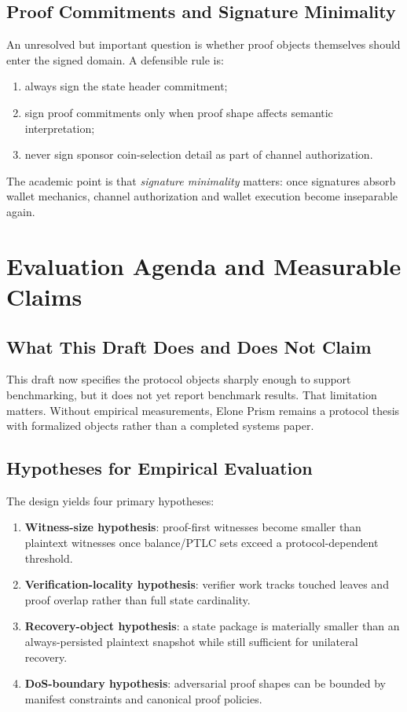 \documentclass[11pt,a4paper]{article}
\begin{document}
\subsection{Proof Commitments and Signature Minimality}

An unresolved but important question is whether proof objects themselves should enter the signed domain. A defensible rule is:
\begin{enumerate}
    \item always sign the state header commitment;
    \item sign proof commitments only when proof shape affects semantic interpretation;
    \item never sign sponsor coin-selection detail as part of channel authorization.
\end{enumerate}

The academic point is that \emph{signature minimality} matters: once signatures absorb wallet mechanics, channel authorization and wallet execution become inseparable again.

\section{Evaluation Agenda and Measurable Claims}

\subsection{What This Draft Does and Does Not Claim}

This draft now specifies the protocol objects sharply enough to support benchmarking, but it does not yet report benchmark results. That limitation matters. Without empirical measurements, Elone Prism remains a protocol thesis with formalized objects rather than a completed systems paper.

\subsection{Hypotheses for Empirical Evaluation}

The design yields four primary hypotheses:
\begin{enumerate}
    \item \textbf{Witness-size hypothesis}: proof-first witnesses become smaller than plaintext witnesses once balance/PTLC sets exceed a protocol-dependent threshold.
    \item \textbf{Verification-locality hypothesis}: verifier work tracks touched leaves and proof overlap rather than full state cardinality.
    \item \textbf{Recovery-object hypothesis}: a state package is materially smaller than an always-persisted plaintext snapshot while still sufficient for unilateral recovery.
    \item \textbf{DoS-boundary hypothesis}: adversarial proof shapes can be bounded by manifest constraints and canonical proof policies.
\end{enumerate}
\end{document}
